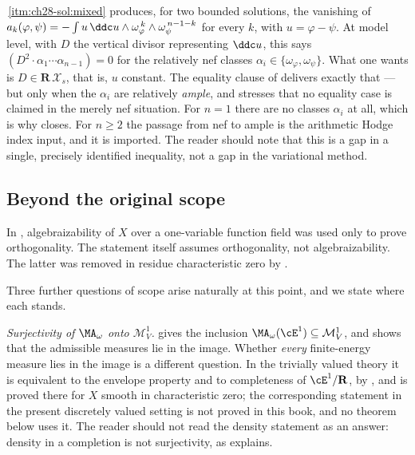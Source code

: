 \begin{remark}
\label{rem:ch28-uniqueness-gap}
\,\cref{itm:ch28-sol:mixed} produces, for two
bounded solutions, the vanishing of
\(a_k(\varphi,\psi)=-\int u\,\ddc u\wedge
\omega_\varphi^{\,k}\wedge\omega_\psi^{\,n-1-k}\) for every \(k\), with
\(u=\varphi-\psi\).  At model level, with \(D\) the vertical divisor
representing \(\ddc u\), this says
\((D^2\cdot\alpha_1\cdots\alpha_{n-1})=0\) for the relatively nef classes
\(\alpha_i\in\{\omega_\varphi,\omega_\psi\}\).  What one wants is
\(D\in\mathbf R\,\mathcal X_s\), that is, \(u\) constant.  The equality
clause of  delivers exactly that ---
but only when the \(\alpha_i\) are relatively \emph{ample}, and
 stresses that no equality case is claimed in the
merely nef situation.  For \(n=1\) there are no classes
\(\alpha_i\) at all, which is why  closes.
For \(n\geq2\) the passage from nef to ample is the arithmetic Hodge index
input, and it is imported.  The reader should note that this is a gap in a
single, precisely identified inequality, not a gap in the variational
method.
\end{remark}

\subsection{Beyond the original scope}
\label{sec:ch28-surjectivity}

In \cite{BFJ15}, algebraizability of \(X\) over a one-variable function
field was used only to prove orthogonality.  The statement
 itself assumes orthogonality, not
algebraizability.  The latter was removed in residue characteristic zero by
\cite[Theorem~6.3.3 and Corollary~6.3.4]{BGGJKM20}.

Three further questions of scope arise naturally at this point, and we state
where each stands.

\emph{Surjectivity of \(\MA_\omega\) onto \(\mathcal M^1_V\).}
 gives the inclusion
\(\MA_\omega(\cE^1)\subseteq\mathcal M^1_V\), and
 shows that the admissible measures lie
in the image.  Whether \emph{every} finite-energy measure lies in the image
is a different question.  In the trivially valued theory it is equivalent to
the envelope property and to completeness of \(\cE^1/\mathbf R\), by
\cite[Theorem~12.8]{BJ22}, and is proved there for \(X\) smooth in
characteristic zero; the corresponding statement in the present discretely
valued setting is not proved in this book, and no theorem below uses it.
The reader should not read the density statement
 as an answer: density in a
completion is not surjectivity, as
 explains.


